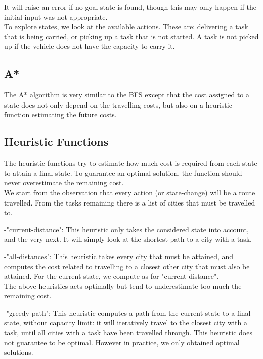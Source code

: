 \documentclass[11pt]{article}
\begin{document}
It will raise an error if no goal state is found, though this may only happen if the initial input was not appropriate.\\ 

To explore states, we look at the available actions. These are: delivering a task that is being carried, or picking up a task that is not started. A task is not picked up if the vehicle does not have the capacity to carry it.

\subsection{A*}
The A* algorithm is very similar to the BFS except that the cost assigned to a state does not only depend on the travelling costs, but also on a heuristic function estimating the future costs.

\subsection{Heuristic Functions}

The heuristic functions try to estimate how much cost is required from each state to attain a final state. To guarantee an optimal solution, the function should never overestimate the remaining cost.\\

We start from the observation that every action (or state-change) will be a route travelled. From the tasks remaining there is a list of cities that must be travelled to.

-"current-distance": This heuristic only takes the considered state into account, and the very next. It will simply look at the shortest path to a city with a task.

-"all-distances": This heuristic takes every city that must be attained, and computes the cost related to travelling to a closest other city that must also be attained. For the current state, we compute as for "current-distance".\\

The above heuristics acts optimally but tend to underestimate too much the remaining cost.

-"greedy-path": This heuristic computes a path from the current state to a final state, without capacity limit: it will iteratively travel to the closest city with a task, until all cities with a task have been travelled through. This heuristic does not guarantee to be optimal. However in practice, we only obtained optimal solutions.
\end{document}
